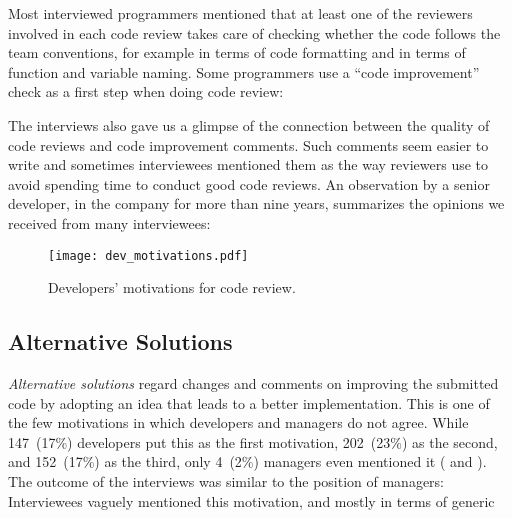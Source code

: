 Most interviewed programmers mentioned that at least one of the reviewers
involved in each code review takes care of checking whether the code follows
the team conventions, for example in terms of code formatting and in terms of
function and variable naming. Some programmers use a ``code improvement''
check as a first step when doing code review: 

The interviews also gave us a glimpse of the connection between the quality of
code reviews and code improvement comments. Such comments seem easier to
write and sometimes interviewees mentioned them as the way reviewers use to
avoid spending time to conduct good code reviews. An observation by a senior
developer, in the company for more than nine years, summarizes the opinions we
received from many interviewees: 

\begin{figure}[t] %
   \centering
   \texttt{[image: dev\_motivations.pdf]}
   \vspace{-1.5em}
   \caption{Developers' motivations for code review.}
   \label{fig:dev-motivations}
   \vspace{-1.5em}
\end{figure}


\subsection{Alternative Solutions}

\emph{Alternative solutions} regard changes and comments on improving the
submitted code by adopting an idea that leads to a better implementation. This
is one of the few motivations in which developers and managers do not agree.
While 147~(17\%) developers put this as the first motivation, 202~(23\%) as the
second, and 152~(17\%) as the third, only 4~(2\%) managers even mentioned it
(\eg {} and
). The outcome of the interviews was similar to the
position of managers: Interviewees vaguely mentioned this motivation, and
mostly in terms of generic 


